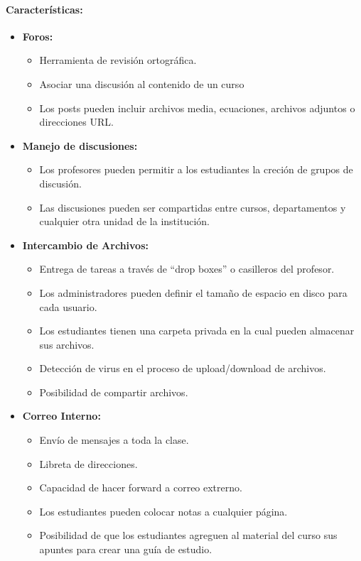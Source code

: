 	\paragraph{Características:}
	\begin{itemize}
		\item \textbf{Foros:}
			\begin{itemize}
				\item Herramienta de revisión ortográfica.
				\item Asociar una discusión al contenido de un curso
				\item Los posts pueden incluir archivos media, ecuaciones, archivos adjuntos o direcciones URL.
				
			\end{itemize}
	\end{itemize}
	\begin{itemize}
		\item \textbf{Manejo de discusiones:}
			\begin{itemize}
				\item Los profesores pueden permitir a los estudiantes la creción de grupos de discusión.
				\item Las discusiones pueden ser compartidas entre cursos, departamentos y cualquier otra unidad de la institución.
			\end{itemize}
	\end{itemize}
	\begin{itemize}
		\item \textbf{Intercambio de Archivos:}
			\begin{itemize}
				\item Entrega de tareas a través de ``drop boxes'' o casilleros del profesor.
				\item Los administradores pueden definir el tamaño de espacio en disco para cada usuario.
				\item Los estudiantes tienen una carpeta privada en la cual pueden almacenar sus archivos.
				\item Detección de virus en el proceso de upload/download de archivos.
				\item Posibilidad de compartir archivos.
			\end{itemize}
	\end{itemize}
	\begin{itemize}
		\item \textbf{Correo Interno:}
			\begin{itemize}
				\item Envío de mensajes a toda la clase.
				\item Libreta de direcciones.
				\item Capacidad de hacer forward a correo extrerno.
				\item Los estudiantes pueden colocar notas a cualquier página.
				\item Posibilidad de que los estudiantes agreguen al material del curso sus apuntes para crear una guía de estudio.
			\end{itemize}
	\end{itemize}

